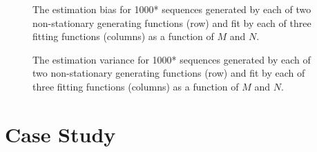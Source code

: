 \documentclass[12pt]{article}
\begin{document}
\begin{figure}[ht]
  \caption{The estimation bias for 1000* sequences generated by each of two non-stationary generating functions (row) and fit by each of three fitting functions (columns) as a function of \(M\) and \(N\).\label{fig:stationary-bias}}
\end{figure}

\begin{figure}[ht]
  \caption{The estimation variance for 1000* sequences generated by each of two non-stationary generating functions (row) and fit by each of three fitting functions (columns) as a function of \(M\) and \(N\).\label{fig:stationary-bias}}
\end{figure}

\section{Case Study}
\end{document}
